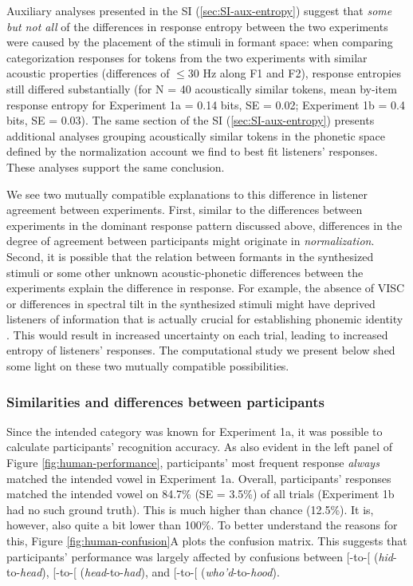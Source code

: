 \documentclass[preprint]{JASA}
\begin{document}
Auxiliary analyses presented in the SI (\ref{sec:SI-aux-entropy}) suggest that \emph{some but not all} of the differences in response entropy between the two experiments were caused by the placement of the stimuli in formant space: when comparing categorization responses for tokens from the two experiments with similar acoustic properties (differences of \(\le 30\) Hz along F1 and F2), response entropies still differed substantially (for N = 40 acoustically similar tokens, mean by-item response entropy for Experiment 1a = 0.14 bits, SE = 0.02; Experiment 1b = 0.4 bits, SE = 0.03). The same section of the SI (\ref{sec:SI-aux-entropy}) presents additional analyses grouping acoustically similar tokens in the phonetic space defined by the normalization account we find to best fit listeners' responses. These analyses support the same conclusion.

We see two mutually compatible explanations to this difference in listener agreement between experiments. First, similar to the differences between experiments in the dominant response pattern discussed above, differences in the degree of agreement between participants might originate in \emph{normalization}. Second, it is possible that the relation between formants in the synthesized stimuli or some other unknown acoustic-phonetic differences between the experiments explain the difference in response. For example, the absence of VISC or differences in spectral tilt in the synthesized stimuli might have deprived listeners of information that is actually crucial for establishing phonemic identity \citep{hillenbrand-nearey1999}. This would result in increased uncertainty on each trial, leading to increased entropy of listeners' responses. The computational study we present below shed some light on these two mutually compatible possibilities.

\subsubsection{Similarities and differences between participants}\label{similarities-and-differences-between-participants}

Since the intended category was known for Experiment 1a, it was possible to calculate participants' recognition accuracy. As also evident in the left panel of Figure \ref{fig:human-performance}, participants' most frequent response \emph{always} matched the intended vowel in Experiment 1a. Overall, participants' responses matched the intended vowel on 84.7\% (SE = 3.5\%) of all trials (Experiment 1b had no such ground truth). This is much higher than chance (12.5\%). It is, however, also quite a bit lower than 100\%. To better understand the reasons for this, Figure \ref{fig:human-confusion}A plots the confusion matrix. This suggests that participants' performance was largely affected by confusions between {[}\ipatext{ɪ}{]}-to-{[}\ipatext{ɛ}{]} (\emph{hid}-to-\emph{head}), {[}\ipatext{ɛ}{]}-to-{[}\ipatext{æ}{]} (\emph{head}-to-\emph{had}), and {[}\ipatext{u}{]}-to-{[}\ipatext{ʊ}{]} (\emph{who'd}-to-\emph{hood}).
\end{document}
